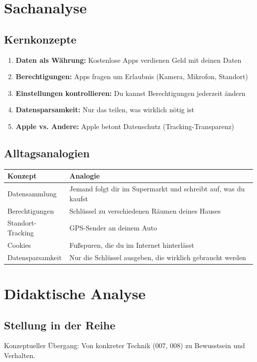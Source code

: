 \documentclass[11pt,a4paper]{article}
\begin{document}
\section{Sachanalyse}

\subsection{Kernkonzepte}
\begin{enumerate}
    \item \textbf{Daten als Währung:} Kostenlose Apps verdienen Geld mit deinen Daten
    \item \textbf{Berechtigungen:} Apps fragen um Erlaubnis (Kamera, Mikrofon, Standort)
    \item \textbf{Einstellungen kontrollieren:} Du kannst Berechtigungen jederzeit ändern
    \item \textbf{Datensparsamkeit:} Nur das teilen, was wirklich nötig ist
    \item \textbf{Apple vs. Andere:} Apple betont Datenschutz (Tracking-Transparenz)
\end{enumerate}

\subsection{Alltagsanalogien}
\begin{tabular}{|l|p{8cm}|}
\hline
\textbf{Konzept} & \textbf{Analogie} \\
\hline
Datensammlung & Jemand folgt dir im Supermarkt und schreibt auf, was du kaufst \\
Berechtigungen & Schlüssel zu verschiedenen Räumen deines Hauses \\
Standort-Tracking & GPS-Sender an deinem Auto \\
Cookies & Fußspuren, die du im Internet hinterlässt \\
Datensparsamkeit & Nur die Schlüssel ausgeben, die wirklich gebraucht werden \\
\hline
\end{tabular}

\section{Didaktische Analyse}

\subsection{Stellung in der Reihe}
Konzeptueller Übergang: Von konkreter Technik (007, 008) zu Bewusstsein und Verhalten.
\end{document}
